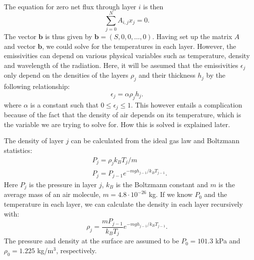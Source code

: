 \documentclass[twocolumn]{article}
\begin{document}
\begin{large}
\begin{equation}
\begin{split}
    \end{split}
\end{equation}
The equation for zero net flux through layer $i$ is then
\begin{equation}
    \sum_{j=0}^{N}A_{i,j}x_j = 0.
\end{equation}
The vector $\mathbf{b}$ is thus given by $\mathbf{b} = (S,0,0,\dots,0)$. Having set up the matrix $A$ and vector $\mathbf{b}$, we could solve for the temperatures in each layer. However, the emissivities can depend on various physical variables such as temperature, density and wavelength of the radiation. Here, it will be assumed that the emissivities $\epsilon_j$ only depend on the densities of the layers $\rho_j$ and their thickness $h_j$ by the following relationship:
\begin{equation}
    \epsilon_j = \alpha\rho_jh_j.
\end{equation}
where $\alpha$ is a constant such that $0\leq\epsilon_j\leq 1$. This however entails a complication because of the fact that the density of air depends on its temperature, which is the variable we are trying to solve for. How this is solved is explained later. 

The density of layer $j$ can be calculated from the ideal gas law and Boltzmann statistics:
\begin{equation}
    \begin{split}
        &P_j = \rho_jk_BT_j/m \\ 
        &P_j = P_{j-1}e^{-mgh_{j-1}/k_BT_{j-1}}.
    \end{split}
\end{equation}
Here $P_j$ is the pressure in layer $j$, $k_B$ is the Boltzmann constant and $m$ is the average mass of an air molecule, $m=4.8\cdot 10^{-26}$ kg. If we know $P_0$ and the temperature in each layer, we can calculate the density in each layer recursively with:
\begin{equation}
    \rho_j = \frac{mP_{j-1}}{k_BT_j}e^{-mgh_{j-1}/k_BT_{j-1}}.
\end{equation}
The pressure and density at the surface are assumed to be $P_0=101.3$ kPa and $\rho_0=1.225$ kg/m$^3$, respectively.



\end{large}
\end{document}
